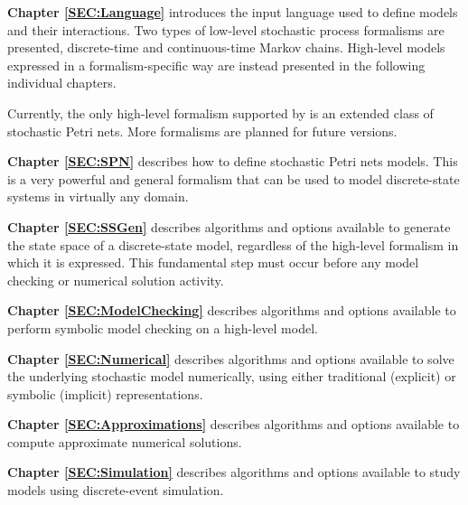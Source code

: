 \begin{description}

\item{\bf Chapter \ref{SEC:Language}}
introduces the {\smart} input language used to define models and their
interactions.
Two types of low-level stochastic process formalisms
are presented, discrete-time and continuous-time
Markov chains. High-level models expressed in
a formalism-specific way are instead presented in the following
individual chapters.

\begin{release}
Currently, the only high-level formalism supported by {\smart}
is an extended class of stochastic Petri nets.
More formalisms are planned for future versions.
\end{release}

\item{\bf Chapter \ref{SEC:SPN}}
describes how to define stochastic Petri nets models.
This is a very powerful and general formalism that can be used to model
discrete-state systems in virtually any domain.

\item{\bf Chapter \ref{SEC:SSGen}}
describes algorithms and options available to generate the state space
of a discrete-state model, regardless of the high-level formalism in which
it is expressed.
This fundamental step must occur before any model checking or
numerical solution activity.

\item{\bf Chapter \ref{SEC:ModelChecking}}
describes algorithms and options available to perform symbolic
model checking on a high-level model.

\item{\bf Chapter \ref{SEC:Numerical}}
describes algorithms and options available to solve the underlying
stochastic model numerically, using either traditional (explicit) or
symbolic (implicit) representations.

\begin{private}
\item{\bf Chapter \ref{SEC:Approximations}}
describes algorithms and options available to compute approximate
numerical solutions.
\end{private}

\begin{private}
\item{\bf Chapter \ref{SEC:Simulation}}
describes algorithms and options available to study models
using discrete-event simulation.
\end{private}


\end{description}
